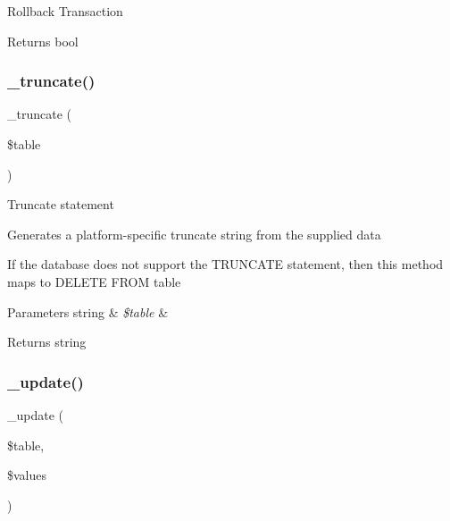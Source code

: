 Rollback Transaction

\begin{DoxyReturn}{Returns}
bool 
\end{DoxyReturn}
\mbox{\label{class_c_i___d_b__mssql__driver_aa029600528fc1ce660a23ff4b4667f95}} 
\subsubsection{\texorpdfstring{\+\_\+truncate()}{\_truncate()}}
{\footnotesize\ttfamily \+\_\+truncate (\begin{DoxyParamCaption}\item[{}]{\$table }\end{DoxyParamCaption})\hspace{0.3cm}{\ttfamily [protected]}}

Truncate statement

Generates a platform-\/specific truncate string from the supplied data

If the database does not support the T\+R\+U\+N\+C\+A\+TE statement, then this method maps to \textquotesingle{}D\+E\+L\+E\+TE F\+R\+OM table\textquotesingle{}


\begin{DoxyParams}[1]{Parameters}
string & {\em \$table} & \\
\hline
\end{DoxyParams}
\begin{DoxyReturn}{Returns}
string 
\end{DoxyReturn}
\mbox{\label{class_c_i___d_b__mssql__driver_a2540b03a93fa73ae74c10d0e16fc073e}} 
\subsubsection{\texorpdfstring{\+\_\+update()}{\_update()}}
{\footnotesize\ttfamily \+\_\+update (\begin{DoxyParamCaption}\item[{}]{\$table,  }\item[{}]{\$values }\end{DoxyParamCaption})\hspace{0.3cm}{\ttfamily [protected]}}

